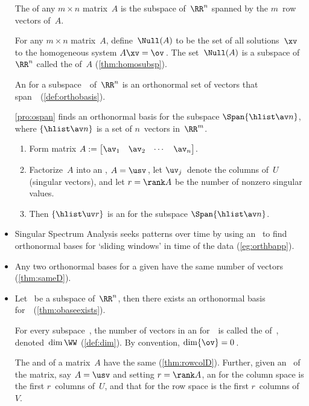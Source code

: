 \begin{itemize}
The  of any $m\times n$ matrix~$A$ is the {subspace} of~$\RR^n$ {span}ned by the \(m\)~{row vector}s of~$A$.

\itemme For any $m\times n$ matrix~$A$, define~$\Null(A)$ to be the set of all solutions~$\xv$ to the {homogeneous} system $A\xv=\ov$\,. 
The set~\(\Null(A)\) is a {subspace} of~$\RR^n$ called the  of~$A$ (\autoref{thm:homosubsp}).

\itemme An  for a {subspace}~\WW\ of~\(\RR^n\) is an {orthonormal set} of vectors that span~\WW\ (\autoref{def:orthobasis}).

\itemhi  \autoref{pro:ospan} finds an {orthonormal basis} for the subspace \(\Span\{\hlist\av n\}\), where $\{\hlist\av n\}$ is a set of $n$~vectors in~\(\RR^m\). 
\begin{enumerate}
\item Form matrix $A:= \begin{bmatrix} \av_1 & \av_2& \cdots&\av_n \end{bmatrix}$. 
\item Factorize~\(A\) into an \svd, $A=\usv$\,, let \(\uv_j\)~denote the columns of~$U$ ({singular vector}s), and let \(r=\rank A\) be the number of nonzero {singular value}s.  
\item Then \(\{\hlist\uv r\}\) is an  for the subspace \(\Span\{\hlist\av n\}\).
\end{enumerate}

\item Singular Spectrum Analysis seeks patterns over time by using an \svd\ to find orthonormal bases for `sliding windows' in time of the data (\autoref{eg:orthbapp}).

\item Any two orthonormal bases for a given  have the same number of vectors (\autoref{thm:sameD}).

\item Let \WW\ be a subspace of~\(\RR^n\), then there exists an orthonormal basis for~\WW\ (\autoref{thm:obaseexists}).

\itemhi For every subspace~\WW, the number of vectors in an  for~\WW\ is called the  of~\WW, denoted~\(\dim\WW\) (\autoref{def:dim}).
By convention, \(\dim\{\ov\}=0\)\,.

\itemme The  and  of a matrix~\(A\) have the same  (\autoref{thm:rowcolD}).
Further, given an \svd\ of the matrix, say \(A=\usv\) and setting \(r=\rank A\), an  for the column space is the first \(r\)~columns of~\(U\), and that for the row space is the first \(r\)~columns of~\(V\).


\end{itemize}
